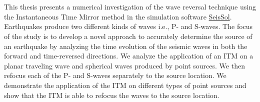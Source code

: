 \chapter{\abstractname}

This thesis presents a numerical investigation of the wave reversal technique using the Instantaneous 
Time Mirror method in the simulation software \href{https://seissol.org/}{SeisSol}. Earthquakes produce two different kinds of waves i.e., P- and S-waves. 
The focus of the study is to develop a novel approach to accurately determine the source of an earthquake by analyzing the time evolution 
of the seismic waves in both the forward and time-reversed directions. We analyze the application of an \acf{ITM} on a planar traveling wave and spherical waves
produced by point sources. We then refocus each of the P- and S-waves separately to the source location. We demonstrate the application
of the \ac{ITM} on different types of point sources and show that the \ac{ITM} is able to refocus the waves to the source location.